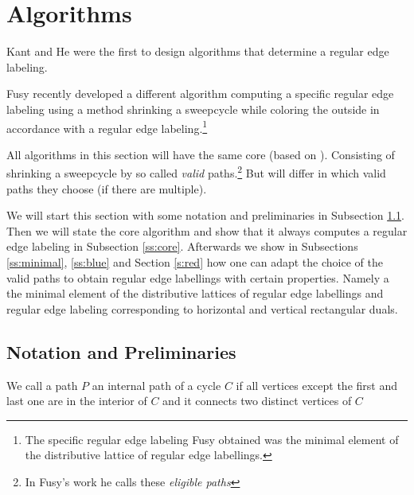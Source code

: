 
\newenvironment{invariants}{%
  \refstepcounter{thrm}%
  \paragraph{Invariants~\theprop}%
  \renewcommand*{\theenumi}{\theprop\,(I\arabic{enumi})}%
  \renewcommand*{\labelenumi}{(I\arabic{enumi})}%
  \enumerate
}{%
  \endenumerate
}

\section{Algorithms}
\label{s:algo}
Kant and He \cite{Kant1997} were the first to design algorithms that determine a regular edge labeling.

Fusy \cite{Fusy2006} recently developed a different algorithm computing a specific regular edge labeling using a method shrinking a sweepcycle while coloring the outside in accordance with a regular edge labeling.\footnote{The specific regular edge labeling Fusy obtained was the minimal element of the distributive lattice of regular edge labellings.}

All algorithms in this section will have the same core (based on \cite{Fusy2006}). Consisting of shrinking a sweepcycle by so called \emph{valid} paths.\footnote{In Fusy's work he calls these \emph{eligible paths}} But will differ in which valid paths they choose (if there are multiple).

We will start this section with some notation and preliminaries in Subsection \ref{ss:not}. Then we will state the core algorithm and show that it always computes a regular edge labeling in Subsection \ref{ss:core}. Afterwards we show in Subsections \ref{ss:minimal}, \ref{ss:blue} and Section \ref{s:red} how one can adapt the choice of the valid paths to obtain regular edge labellings with certain properties. Namely a the minimal element of the distributive lattices of regular edge labellings and regular edge labeling corresponding to horizontal and vertical rectangular duals.


\subsection{Notation and Preliminaries}
\label{ss:not}
\begin{defi}
We call a path $P$ an internal path of a cycle $C$ if all vertices except the first and last one are in the interior of $C$ and it connects two distinct vertices of $C$
\end{defi}

